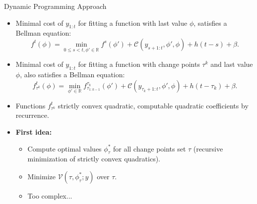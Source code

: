 \documentclass[10pt, xcolor=dvipsnames]{beamer}
\begin{document}
\begin{frame}{Dynamic Programming Approach}
\begin{itemize}
\item Minimal cost of $y_{1:t}$ for fitting a function with last value $\phi$, satisfies a Bellman equation:
$$
 f^t(\phi) = \min\limits_{0\leq s <t, \phi' \in \mathbb{R}} f^s(\phi') + \mathcal{C}(y_{s+1:t}, \phi', \phi) + h(t-s) + \beta.
$$
\item Minimal cost of $y_{1:t}$ for fitting a function with change points $\tau^k$ and last value $\phi$, also satisfies a Bellman equation:
$$
f^t_{\tau^k}(\phi) = \min\limits_{\phi' \in \mathbb{R}}  f_{\tau_{1:k-1}}^{\tau_k}(\phi') + \mathcal{C}(y_{\tau_k+1:t}, \phi', \phi) + h(t - \tau_k) + \beta.
$$

\item Functions $f_{\tau^k}^t$ strictly convex quadratic, computable quadratic coefficients by recurrence. 

\item \textbf{First idea:} 
    \begin{itemize}
        \item Compute optimal values $\phi_{\tau}^*$ for all change points set $\tau$ (recursive minimization of strictly convex quadratics).
        \item Minimize $\mathcal{V}(\tau, \phi_{\tau}^*;y)$ over $\tau$.
        \item Too complex... 
    \end{itemize}
\end{itemize}
\end{frame}
\end{document}
